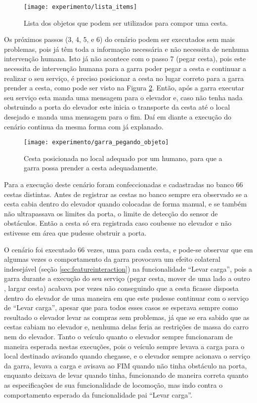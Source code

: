 \begin{figure}[!htb] \centering 
  \centering
  \texttt{[image: experimento/lista\_items]} 
  \caption{Lista dos objetos que podem ser utilizados para compor uma cesta.} 
  \label{fig:lista_objetos}
\end{figure}

Os próximos passos (3, 4, 5, e 6) do cenário podem ser executados sem mais problemas, pois já têm toda a informação necessária e não necessita de nenhuma intervenção humana. Isto já não acontece com o passo 7 (pegar cesta), pois este necessita de intervenção humana para a garra poder pegar a cesta e continuar a realizar o seu serviço, é preciso posicionar a cesta no lugar correto para a garra prender a cesta, como pode ser visto na Figura \ref{fig:garra_pegando_objeto}. Então, após a garra executar seu serviço esta manda uma mensagem para o elevador e, caso não tenha nada obstruindo a porta do elevador este inicia o transporte da cesta até o local desejado e manda uma mensagem para o fim. Daí em diante a execução do cenário continua da mesma forma com já explanado.

\begin{figure}[!htb] \centering 
  \centering
  \texttt{[image: experimento/garra\_pegando\_objeto]} 
  \caption{Cesta posicionada no local adequado por um humano, para que a garra possa prender a cesta adequadamente.} 
  \label{fig:garra_pegando_objeto}
\end{figure}

Para a execução deste cenário foram confeccionadas e cadastradas no banco 66 cestas distintas. Antes de registrar as cestas no banco sempre era observado se a cesta cabia dentro do elevador quando colocadas de forma manual, e se também não ultrapassava os limites da porta, o limite de detecção do sensor de obstáculos. Então a cesta só era registrada caso coubesse no elevador e não estivesse em área que pudesse obstruir a porta.

O cenário foi executado 66 vezes, uma para cada cesta, e pode-se observar que em algumas vezes o comportamento da garra provocava um efeito colateral indesejável (seção \ref{sec:featureinteraction}) na funcionalidade ``Levar carga'', pois a garra durante a execução do seu serviço (pegar cesta, mover de uma lado a outro , largar cesta) acabava por vezes não conseguindo que a cesta ficasse disposta dentro do elevador de uma maneira em que este pudesse continuar com o serviço de ``Levar carga'', apesar que para todos esses casos se esperava sempre como resultado o elevador levar as compras sem problemas, já que se era sabido que as cestas cabiam no elevador e, nenhuma delas feria as restrições de massa do carro nem do elevador. Tanto o veículo quanto o elevador sempre funcionaram de maneira esperada nestas execuções, pois o veículo sempre levava a carga para o local destinado avisando quando chegasse, e o elevador sempre acionava o serviço da garra, levava a carga  e avisava ao FIM quando não tinha obstáculo na porta, enquanto deixava de levar quando tinha, funcionando de maneira correta quanto as especificações de sua funcionalidade de locomoção, mas indo contra o comportamento esperado da funcionalidade pai ``Levar carga''. 

